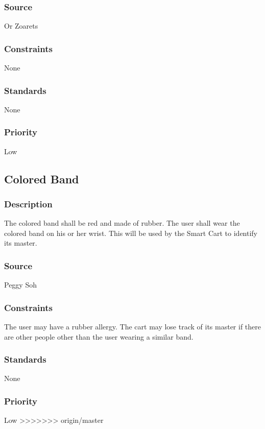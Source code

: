 \subsubsection{Source}
Or Zoarets
\subsubsection{Constraints}
None
\subsubsection{Standards}
None
\subsubsection{Priority}
Low


\subsection{Colored Band}
\subsubsection{Description}
The colored band shall be red and made of rubber. The user shall wear the colored band on his or her wrist. This will be used by the Smart Cart to identify its master. 
\subsubsection{Source}
Peggy Soh
\subsubsection{Constraints}
The user may have a rubber allergy. The cart may lose track of its master if there are other people other than the user wearing a similar band.
\subsubsection{Standards}
None
\subsubsection{Priority}
Low
>>>>>>> origin/master
